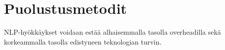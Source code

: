 \chapter{Puolustusmetodit\label{discussion}}
NLP-hyökkäykset voidaan estää alhaisemmalla tasolla overheadilla sekä korkeammalla tasolla edistyneen teknologian turvin.